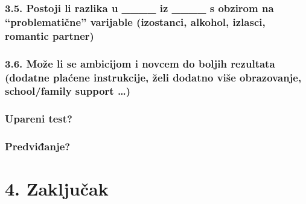 \documentclass[
]{article}
\begin{document}
\hypertarget{postoji-li-razlika-u-____-iz-____-s-obzirom-na-problematiux10dne-varijable-izostanci-alkohol-izlasci-romantic-partner}{%
\subsubsection{3.5. Postoji li razlika u \_\_\_\_ iz \_\_\_\_ s obzirom
na ``problematične'' varijable (izostanci, alkohol, izlasci, romantic
partner)}\label{postoji-li-razlika-u-____-iz-____-s-obzirom-na-problematiux10dne-varijable-izostanci-alkohol-izlasci-romantic-partner}}

\hypertarget{moux17ee-li-se-ambicijom-i-novcem-do-boljih-rezultata-dodatne-plaux107ene-instrukcije-ux17eeli-dodatno-viux161e-obrazovanje-schoolfamily-support}{%
\subsubsection{3.6. Može li se ambicijom i novcem do boljih rezultata
(dodatne plaćene instrukcije, želi dodatno više obrazovanje,
school/family support
\ldots)}\label{moux17ee-li-se-ambicijom-i-novcem-do-boljih-rezultata-dodatne-plaux107ene-instrukcije-ux17eeli-dodatno-viux161e-obrazovanje-schoolfamily-support}}

\hypertarget{upareni-test}{%
\subsubsection{Upareni test?}\label{upareni-test}}

\hypertarget{predviux111anje}{%
\subsubsection{Predviđanje?}\label{predviux111anje}}

\hypertarget{zakljuux10dak}{%
\section{4. Zaključak}\label{zakljuux10dak}}
\end{document}
